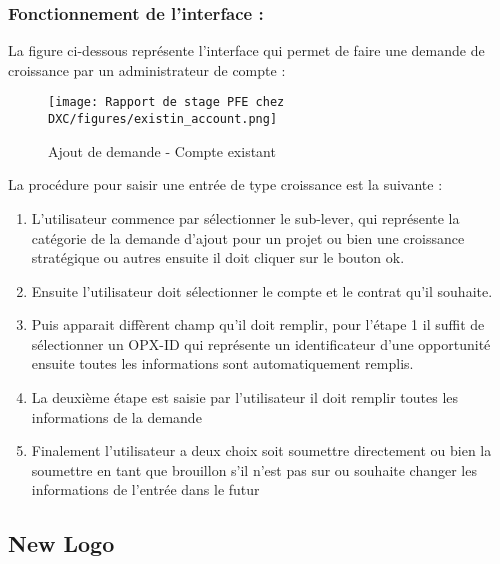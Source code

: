\newpage

\subsubsection{Fonctionnement de l'interface :}

La figure ci-dessous représente l'interface qui permet de faire une demande de croissance par un administrateur de compte :

\begin{figure}[!h]
    \centering
    \texttt{[image: Rapport de stage PFE chez DXC/figures/existin\_account.png]}
    \caption{Ajout de demande - Compte existant}
\end{figure}

La procédure pour saisir une entrée de type croissance est la suivante :

\begin{enumerate}
    
    \item L'utilisateur commence par sélectionner le sub-lever, qui représente la catégorie de la demande d'ajout pour un projet ou bien une croissance stratégique ou autres ensuite il doit cliquer sur le bouton ok.
    \vspace{0.1cm}
    \item Ensuite l'utilisateur doit sélectionner le compte et le contrat qu'il souhaite.
    \vspace{0.1cm}
    \item Puis apparait diffèrent champ qu'il doit remplir, pour l'étape 1 il suffit de sélectionner un OPX-ID qui représente un identificateur d'une opportunité ensuite toutes les informations sont automatiquement remplis.
    \vspace{0.1cm}
    \item La deuxième étape est saisie par l'utilisateur il doit remplir toutes les informations de la demande
    \vspace{0.1cm}
    \item Finalement l'utilisateur a deux choix soit soumettre directement ou bien la soumettre en tant que brouillon s'il n'est pas sur ou souhaite changer les informations de l'entrée dans le futur

\end{enumerate}

\newpage


\subsection{New Logo}

